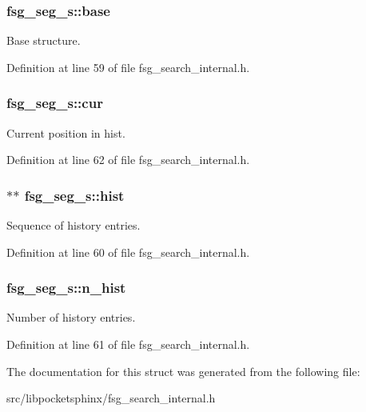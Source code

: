 \subsubsection[{base}]{ {\bf fsg\-\_\-seg\-\_\-s\-::base}}\label{structfsg__seg__s_a9f977be4814ec887aadb3cea35f96bab}


\-Base structure. 



\-Definition at line 59 of file fsg\-\_\-search\-\_\-internal.\-h.

\subsubsection[{cur}]{ {\bf fsg\-\_\-seg\-\_\-s\-::cur}}\label{structfsg__seg__s_a4b5e46bf79915c97845974e80355ebbe}


\-Current position in hist. 



\-Definition at line 62 of file fsg\-\_\-search\-\_\-internal.\-h.

\subsubsection[{hist}]{$\ast$$\ast$ {\bf fsg\-\_\-seg\-\_\-s\-::hist}}\label{structfsg__seg__s_ae41fbe837c6c921133c91453c58ba68e}


\-Sequence of history entries. 



\-Definition at line 60 of file fsg\-\_\-search\-\_\-internal.\-h.

\subsubsection[{n\-\_\-hist}]{ {\bf fsg\-\_\-seg\-\_\-s\-::n\-\_\-hist}}\label{structfsg__seg__s_aca806a5b88f77803fff4c4c984034515}


\-Number of history entries. 



\-Definition at line 61 of file fsg\-\_\-search\-\_\-internal.\-h.



\-The documentation for this struct was generated from the following file\-:\begin{DoxyCompactItemize}
\item 
src/libpocketsphinx/fsg\-\_\-search\-\_\-internal.\-h\end{DoxyCompactItemize}
